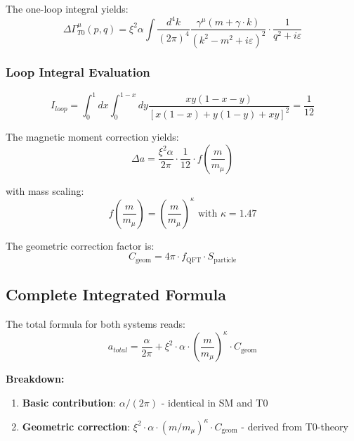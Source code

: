 \documentclass[12pt,a4paper]{article}
\numberwithin{equation}{section}
\newcommand{\xipar}{\xi}
\newcommand{\Cgeom}{C_{\text{geom}}}
\newcommand{\fQFT}{f_{\text{QFT}}}
\newcommand{\Sparticle}{S_{\text{particle}}}
\newcommand{\kappaT}{\kappa}
\newcommand{\mmu}{m_{\mu}}
\begin{document}
	The one-loop integral yields:
	\begin{equation}
		\label{eq:loop_integral}
		\Delta\Gamma^\mu_{T0}(p,q) = \xipar^2 \alpha \int \frac{d^4k}{(2\pi)^4} \frac{\gamma^\mu(m + \gamma \cdot k)}{(k^2 - m^2 + i\varepsilon)^2} \cdot \frac{1}{q^2 + i\varepsilon}
	\end{equation}
	
	\subsubsection{Loop Integral Evaluation}
	
	\begin{equation}
		\label{eq:loop_evaluation}
		I_{loop} = \int_0^1 dx \int_0^{1-x} dy \frac{xy(1-x-y)}{[x(1-x) + y(1-y) + xy]^2} = \frac{1}{12}
	\end{equation}
	
	The magnetic moment correction yields:
	\begin{equation}
		\label{eq:magnetic_correction}
		\Delta a = \frac{\xipar^2 \alpha}{2\pi} \cdot \frac{1}{12} \cdot f\left(\frac{m}{\mmu}\right)
	\end{equation}
	
	with mass scaling:
	\begin{equation}
		\label{eq:mass_scaling}
		f\left(\frac{m}{\mmu}\right) = \left(\frac{m}{\mmu}\right)^\kappaT \text{ with } \kappaT = 1.47
	\end{equation}
	
	The geometric correction factor is:
	\begin{equation}
		\label{eq:geometric_factor}
		\Cgeom = 4\pi \cdot \fQFT \cdot \Sparticle
	\end{equation}
	
	\subsection{Complete Integrated Formula}
	
	The total formula for both systems reads:
	\begin{equation}
		\label{eq:total_formula}
		a_{total} = \frac{\alpha}{2\pi} + \xipar^2 \cdot \alpha \cdot \left(\frac{m}{\mmu}\right)^\kappaT \cdot \Cgeom
	\end{equation}
	
	\textbf{Breakdown:}
	\begin{enumerate}
		\item \textbf{Basic contribution}: $\alpha/(2\pi)$ - identical in SM and T0
		\item \textbf{Geometric correction}: $\xipar^2 \cdot \alpha \cdot (m/\mmu)^\kappaT \cdot \Cgeom$ - derived from T0-theory
	\end{enumerate}
	
\end{document}
